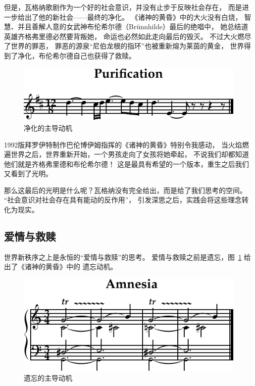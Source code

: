 \documentclass[10pt,a4paper,twocolumn]{article}
\begin{document}
      但是，瓦格纳歌剧作为一个好的社会意识，并没有止步于反映社会存在，
      而是进一步给出了他的新社会——最终的净化。
      《诸神的黄昏》中的大火没有白烧，
      智慧、并且善解人意的女武神布伦希尔德（Br\"unnhilde）最后的绝唱中，
      她总结道英雄齐格弗里德必然要背叛她，
      命运也必然如此走向最后的毁灭。
      不过大火燃尽了世界的罪恶，
      罪恶的源泉``尼伯龙根的指环''也被重新熔为莱茵的黄金，
      世界得到了净化，布伦希尔德自己也获得了救赎。
      \begin{figure}[htbp]
        \centering
        \includegraphics[width=\linewidth]{music/purification-crop.pdf}
        \caption{净化的主导动机\cite{wagner1876gotterdammerung}}
      \end{figure}

      1992版拜罗伊特制作巴伦博伊姆指挥的《诸神的黄昏》特别令我感动，
      当火焰燃遍世界之后，世界重新开始，一个男孩走向了女孩将她牵起，
      不说我们却都知道他们就是齐格弗里德和布伦希尔德！
      这是最具有希望的一个版本，重生之后我们又看到了光明。

      那么这最后的光明是什么呢？瓦格纳没有完全给出，而是给了我们思考的空间。
      ``社会意识对社会存在具有能动的反作用''\cite{book}，
      引发深思之后，实践会将这些理念转化为现实。


    \subsection{爱情与救赎}

      世界新秩序之上是永恒的``爱情与救赎''的思考。
      爱情与救赎之前是遗忘，图~\ref{fig:amnesia} 给出了《诸神的黄昏》中的
      遗忘动机。
      \begin{figure}[htbp]
        \centering
        \includegraphics{music/amnesia-crop.pdf}
        \caption{遗忘的主导动机\cite{wagner1876gotterdammerung}}
        \label{fig:amnesia}
      \end{figure}
\end{document}
